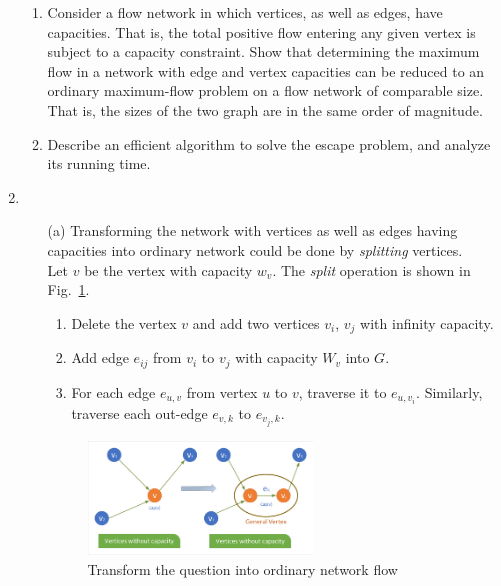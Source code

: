 \documentclass[12pt,a4paper]{article}
\makeatletter
\newtheorem*{solution}{Solution}
\theoremstyle{definition}
\renewenvironment{solution}[1][Solution] {\par\pushQED{\qed}\normalfont\topsep6\p@\@plus6\p@\relax\trivlist\item[\hskip\labelsep\bfseries#1\@addpunct{.}]\ignorespaces}{\popQED\endtrivlist\@endpefalse} \makeatother
\makeatother
\begin{document}
\begin{enumerate}
    \begin{enumerate}
        \item Consider a flow network in which vertices, as well as edges, have capacities. That is, the total positive flow entering any given vertex is subject to a capacity constraint. Show that determining the maximum flow in a network with edge and vertex capacities can be reduced to an ordinary maximum-flow problem on a flow network of comparable size. That is, the sizes of the two graph are in the same order of magnitude.
        \item Describe an efficient algorithm to solve the escape problem, and analyze its running time.
    \end{enumerate}
    \begin{solution}
    ~\\
    \begin{enumerate}
        \item [(a)]
        Transforming the network with vertices as well as edges having capacities into ordinary network could be done by \emph{splitting} vertices.
        \\
        Let $v$ be the vertex with capacity $w_v$.
        The \emph{split} operation is shown in Fig.~\ref{Fig-P3T1}. 
        \\
        \begin{enumerate}
            \item Delete the vertex $v$ and add two vertices $v_i$, $v_j$ with infinity capacity.
            \item Add edge $e_{ij}$ from $v_i$ to $v_j$ with capacity $W_v$ into $G$.
            \item For each edge $e_{u,v}$ from vertex $u$ to $v$, traverse it to $e_{u,v_i}$. Similarly, traverse each out-edge $e_{v,k}$ to $e_{v_j,k}$.
        \end{enumerate}
        \begin{figure}[!htbp]
        	\centering
        	\includegraphics[width=0.6\textwidth]{Fig-P3T1.pdf}
        	\caption{Transform the question into ordinary network flow}
        	\label{Fig-P3T1}

\end{figure}
\end{enumerate}
\end{solution}
\end{enumerate}
\end{document}
